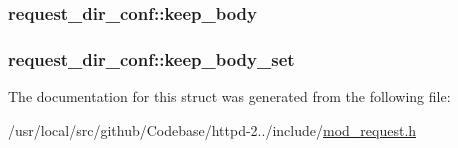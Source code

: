 \subsubsection[{\texorpdfstring{keep\+\_\+body}{keep_body}}]{ request\+\_\+dir\+\_\+conf\+::keep\+\_\+body}\hypertarget{structrequest__dir__conf_a5176f45488e5d5a4cc65587f8ebe1367}{}\label{structrequest__dir__conf_a5176f45488e5d5a4cc65587f8ebe1367}
\subsubsection[{\texorpdfstring{keep\+\_\+body\+\_\+set}{keep_body_set}}]{ request\+\_\+dir\+\_\+conf\+::keep\+\_\+body\+\_\+set}\hypertarget{structrequest__dir__conf_ac22430cc266c0830362dec8a40b3aaee}{}\label{structrequest__dir__conf_ac22430cc266c0830362dec8a40b3aaee}


The documentation for this struct was generated from the following file\+:\begin{DoxyCompactItemize}
\item 
/usr/local/src/github/\+Codebase/httpd-\/2../include/\hyperlink{mod__request_8h}{mod\+\_\+request.\+h}\end{DoxyCompactItemize}
